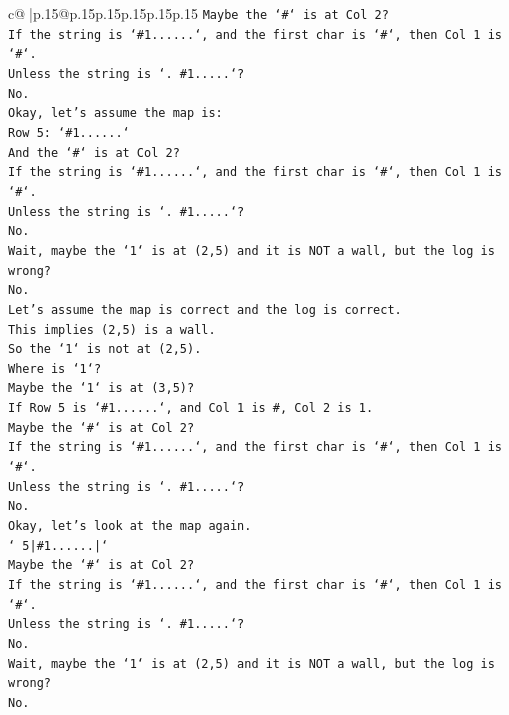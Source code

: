 \documentclass{article}
\begin{document}
{\begin{supertabular}{c@{$\;$}|p{.15\linewidth}@{}p{.15\linewidth}p{.15\linewidth}p{.15\linewidth}p{.15\linewidth}p{.15\linewidth}}
{{{\texttt{Maybe the `\#` is at Col 2?} \\
\texttt{If the string is `\#1......`, and the first char is `\#`, then Col 1 is `\#`.} \\
\texttt{Unless the string is `. \#1.....`?} \\
\texttt{No.} \\
\texttt{Okay, let's assume the map is:} \\
\texttt{Row 5: `\#1......`} \\
\texttt{And the `\#` is at Col 2?} \\
\texttt{If the string is `\#1......`, and the first char is `\#`, then Col 1 is `\#`.} \\
\texttt{Unless the string is `. \#1.....`?} \\
\texttt{No.} \\
\texttt{Wait, maybe the `1` is at (2,5) and it is NOT a wall, but the log is wrong?} \\
\texttt{No.} \\
\texttt{Let's assume the map is correct and the log is correct.} \\
\texttt{This implies (2,5) is a wall.} \\
\texttt{So the `1` is not at (2,5).} \\
\texttt{Where is `1`?} \\
\texttt{Maybe the `1` is at (3,5)?} \\
\texttt{If Row 5 is `\#1......`, and Col 1 is \#, Col 2 is 1.} \\
\texttt{Maybe the `\#` is at Col 2?} \\
\texttt{If the string is `\#1......`, and the first char is `\#`, then Col 1 is `\#`.} \\
\texttt{Unless the string is `. \#1.....`?} \\
\texttt{No.} \\
\texttt{Okay, let's look at the map again.} \\
\texttt{` 5|\#1......|`} \\
\texttt{Maybe the `\#` is at Col 2?} \\
\texttt{If the string is `\#1......`, and the first char is `\#`, then Col 1 is `\#`.} \\
\texttt{Unless the string is `. \#1.....`?} \\
\texttt{No.} \\
\texttt{Wait, maybe the `1` is at (2,5) and it is NOT a wall, but the log is wrong?} \\
\texttt{No.} \\
}}}
\end{supertabular}}
\end{document}
